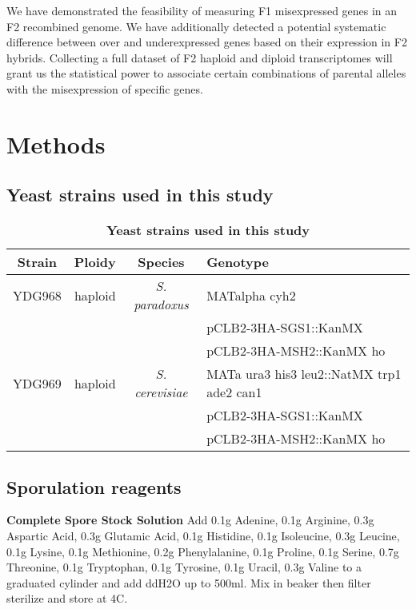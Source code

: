 We have demonstrated the feasibility of measuring F1 misexpressed genes in an F2 recombined genome. We have additionally detected a potential systematic difference between over and underexpressed genes based on their expression in F2 hybrids. Collecting a full dataset of F2 haploid and diploid transcriptomes will grant us the statistical power to associate certain combinations of parental alleles with the misexpression of specific genes.

\section{Methods}

\subsection{Yeast strains used in this study}

\begin{table}[H]
\centering
\begin{tabular}{|c|c|c|l|}
\hline
{\bf Strain} & {\bf Ploidy} & {\bf Species} & {\bf Genotype} \\ 
\hline
YDG968 & haploid & \textit{S. paradoxus} & MATalpha cyh2 \\
&&& pCLB2-3HA-SGS1::KanMX \\
&&& pCLB2-3HA-MSH2::KanMX ho \\ \hline
YDG969 & haploid & \textit{S. cerevisiae} & MATa ura3 his3 leu2::NatMX trp1 ade2 can1 \\
&&& pCLB2-3HA-SGS1::KanMX \\
&&& pCLB2-3HA-MSH2::KanMX ho \\ 
\hline
\end{tabular}
\caption{{\bf Yeast strains used in this study}}
 \label{tableStrains}
\end{table}

\subsection{Sporulation reagents}

{\bf Complete Spore Stock Solution} Add 0.1g Adenine, 0.1g Arginine, 0.3g Aspartic Acid, 0.3g Glutamic Acid, 0.1g Histidine, 0.1g Isoleucine, 0.3g Leucine, 0.1g Lysine, 0.1g Methionine, 0.2g Phenylalanine, 0.1g Proline, 0.1g Serine, 0.7g Threonine, 0.1g Tryptophan, 0.1g Tyrosine, 0.1g Uracil, 0.3g Valine to a graduated cylinder and add ddH2O up to 500ml. Mix in beaker then filter sterilize and store at 4C. \\

